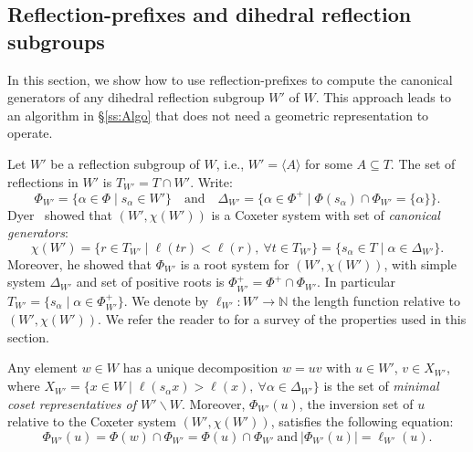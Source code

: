 \documentclass{amsart}
\theoremstyle{definition}
\begin{document}
\subsection{Reflection-prefixes and dihedral reflection subgroups} In this section, we show how to use reflection-prefixes to compute the canonical generators of any dihedral reflection subgroup $W'$ of $W$. This approach leads to an algorithm in \S\ref{ss:Algo} that does not need a geometric representation to operate. 
\smallskip

Let $W'$ be a reflection subgroup of $W$, i.e., $W'=\langle A\rangle$ for some $A\subseteq T$. The set of reflections in $W'$ is $T_{W'}=T\cap W'$. Write:
$$
\Phi_{W'}=\{\alpha \in \Phi \mid s_\alpha \in W'\}\quad \textrm{and}\quad \Delta_{W'}=\{\alpha\in \Phi^+ \mid \Phi(s_\alpha)\cap \Phi_{W'}=\{\alpha\}\}.
$$
Dyer~\cite{Dy90} showed that $(W',\chi(W'))$ is a Coxeter system with set of {\em canonical generators}:
$$
\chi(W')=\{r\in T_{W'}\mid \ell(tr)<\ell(r),\ \forall t\in T_{W'}\}=\{s_\alpha \in T\mid \alpha\in \Delta_{W'}\}.
$$
Moreover, he showed that $\Phi_{W'}$ is a root system for $(W',\chi(W'))$, with simple system  $\Delta_{W'}$ and  set of positive roots is $\Phi_{W'}^+=\Phi^+\cap \Phi_{W'}$. In particular $T_{W'}=\{s_\alpha\mid \alpha\in\Phi_{W'}^+\}$. We denote by $\ell_{W'}:W'\to \mathbb N$ the  length function relative to $(W',\chi(W'))$. We refer the reader to \cite[\S2.8~\&~\S2.9]{DFHM24} for a survey of the properties used in this section.

 
Any element $w\in W$ has a unique decomposition $w=uv$ with $u\in W'$, $v\in X_{W'}$, where $X_{W'}=\{x\in W\mid \ell(s_\alpha x) >\ell(x),\ \forall \alpha\in\Delta_{W'}\}$ is the set of {\em minimal coset representatives of $W'\backslash W$}. Moreover, $\Phi_{W'}(u)$, the inversion set of $u$ relative to the Coxeter system $(W',\chi(W'))$, satisfies the following equation: 
$$
\Phi_{W'}(u)=\Phi(w)\cap \Phi_{W'}=\Phi(u)\cap\Phi_{W'}\ \text{and}\ |\Phi_{W'}(u)|=\ell_{W'}(u).
$$

 \smallskip
 
\end{document}
